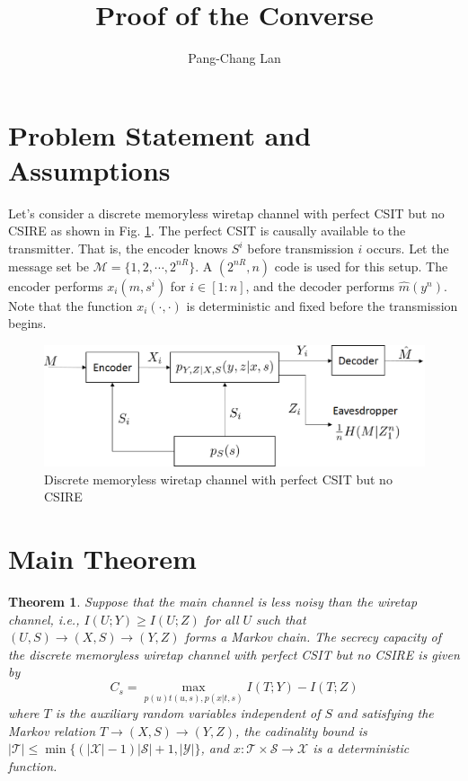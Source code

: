 \documentclass[12pt, Draft, onecolumn]{IEEEtran}
\def\ie{{\it i.e., }}
\def\calM{{\mathcal{M}}}
\def\calS{{\mathcal{S}}}
\def\calX{{\mathcal{X}}}
\def\calY{{\mathcal{Y}}}
\def\calT{{\mathcal{T}}}
\newtheorem{theorem}{Theorem}
\begin{document}
\title{Proof of the Converse}
\author{Pang-Chang Lan}
\maketitle

\section{Problem Statement and Assumptions}
Let's consider a discrete memoryless wiretap channel with perfect CSIT but no CSIRE as shown in Fig. \ref{fig.secrecy_noCSIR_channel}. The perfect CSIT is causally available to the transmitter. That is, the encoder knows $S^i$ before transmission $i$ occurs. Let the message set be $\calM=\{1,2,\cdots,2^{nR}\}$. A $(2^{nR},n)$ code is used for this setup. The encoder performs $x_i(m,s^i)$ for $i\in [1:n]$, and the decoder performs $\hat{m}(y^n)$. Note that the function $x_i(\cdot, \cdot)$ is deterministic and fixed before the transmission begins.

\begin{figure}[h]
\centering
\includegraphics[scale=.6]{figs/secrecy_noCSIR_channel}
\caption{Discrete memoryless wiretap channel with perfect CSIT but no CSIRE}
\label{fig.secrecy_noCSIR_channel}
\end{figure}

\section{Main Theorem}
\begin{theorem}
Suppose that the main channel is less noisy than the wiretap channel, \ie $I(U;Y)\geq I(U;Z)$ for all $U$ such that $(U,S)\rightarrow (X,S)\rightarrow (Y,Z)$ forms a Markov chain. The secrecy capacity of the discrete memoryless wiretap channel with perfect CSIT but no CSIRE is given by
\begin{equation}
C_s = \max_{p(u)t(u,s),p(x|t,s)} I(T;Y)-I(T;Z)
\end{equation}
where $T$ is the auxiliary random variables independent of $S$ and satisfying the Markov relation $T\rightarrow (X,S)\rightarrow (Y,Z)$, the cadinality bound is $|\calT|\leq \min\{(|\calX|-1)|\calS|+1,|\calY|\}$, and $x:\calT\times\calS\rightarrow\calX$ is a deterministic function.
\end{theorem}
\end{document}
